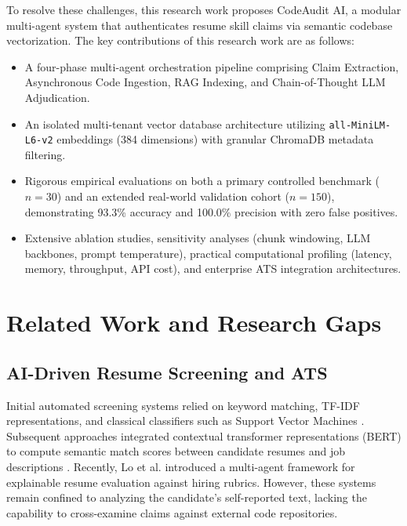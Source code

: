 \documentclass[conference]{IEEEtran}
\begin{document}
To resolve these challenges, this research work proposes CodeAudit AI, a modular multi-agent system that authenticates resume skill claims via semantic codebase vectorization. The key contributions of this research work are as follows:
\begin{itemize}
    \item A four-phase multi-agent orchestration pipeline comprising Claim Extraction, Asynchronous Code Ingestion, RAG Indexing, and Chain-of-Thought LLM Adjudication.
    \item An isolated multi-tenant vector database architecture utilizing \texttt{all-MiniLM-L6-v2} embeddings (384 dimensions) with granular ChromaDB metadata filtering.
    \item Rigorous empirical evaluations on both a primary controlled benchmark ($n=30$) and an extended real-world validation cohort ($n=150$), demonstrating 93.3\% accuracy and 100.0\% precision with zero false positives.
    \item Extensive ablation studies, sensitivity analyses (chunk windowing, LLM backbones, prompt temperature), practical computational profiling (latency, memory, throughput, API cost), and enterprise ATS integration architectures.
\end{itemize}

\section{Related Work and Research Gaps}

\subsection{AI-Driven Resume Screening and ATS}
Initial automated screening systems relied on keyword matching, TF-IDF representations, and classical classifiers such as Support Vector Machines \cite{sinha2021resumescreening, alamri2022nlp}. Subsequent approaches integrated contextual transformer representations (BERT) to compute semantic match scores between candidate resumes and job descriptions \cite{devlin2019bert, deshpande2023candidate}. Recently, Lo et al. \cite{lo2025aihiring} introduced a multi-agent framework for explainable resume evaluation against hiring rubrics. However, these systems remain confined to analyzing the candidate's self-reported text, lacking the capability to cross-examine claims against external code repositories.
\end{document}
